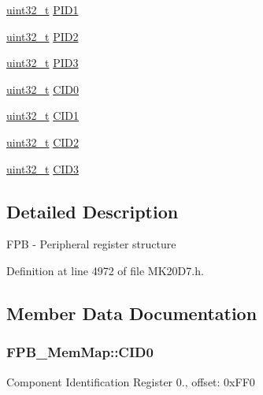 \begin{DoxyCompactItemize}
\item 
\hyperlink{_p_e___types_8h_a33594304e786b158f3fb30289278f5af}{uint32\+\_\+t} \hyperlink{struct_f_p_b___mem_map_a4973e107a9b956437a6e62fb154c1295}{P\+I\+D1}
\item 
\hyperlink{_p_e___types_8h_a33594304e786b158f3fb30289278f5af}{uint32\+\_\+t} \hyperlink{struct_f_p_b___mem_map_a1a53923b7f5f3565b3c23fcfacc76232}{P\+I\+D2}
\item 
\hyperlink{_p_e___types_8h_a33594304e786b158f3fb30289278f5af}{uint32\+\_\+t} \hyperlink{struct_f_p_b___mem_map_a50469498a2399ab61bfa9c1826a1932a}{P\+I\+D3}
\item 
\hyperlink{_p_e___types_8h_a33594304e786b158f3fb30289278f5af}{uint32\+\_\+t} \hyperlink{struct_f_p_b___mem_map_ad9aa53125967afe84ec6267d3b147be9}{C\+I\+D0}
\item 
\hyperlink{_p_e___types_8h_a33594304e786b158f3fb30289278f5af}{uint32\+\_\+t} \hyperlink{struct_f_p_b___mem_map_a252a9bf3bd58aa080c9058f8acbc9dd0}{C\+I\+D1}
\item 
\hyperlink{_p_e___types_8h_a33594304e786b158f3fb30289278f5af}{uint32\+\_\+t} \hyperlink{struct_f_p_b___mem_map_a682979a59af5457d6c388fb11274fd9a}{C\+I\+D2}
\item 
\hyperlink{_p_e___types_8h_a33594304e786b158f3fb30289278f5af}{uint32\+\_\+t} \hyperlink{struct_f_p_b___mem_map_a75c3b9a038df70053d980c6ee3d2d821}{C\+I\+D3}
\end{DoxyCompactItemize}


\subsection{Detailed Description}
F\+PB -\/ Peripheral register structure 

Definition at line 4972 of file M\+K20\+D7.\+h.



\subsection{Member Data Documentation}
\subsubsection[{\texorpdfstring{C\+I\+D0}{CID0}}]{ F\+P\+B\+\_\+\+Mem\+Map\+::\+C\+I\+D0}\hypertarget{struct_f_p_b___mem_map_ad9aa53125967afe84ec6267d3b147be9}{}\label{struct_f_p_b___mem_map_ad9aa53125967afe84ec6267d3b147be9}
Component Identification Register 0., offset\+: 0x\+F\+F0 

